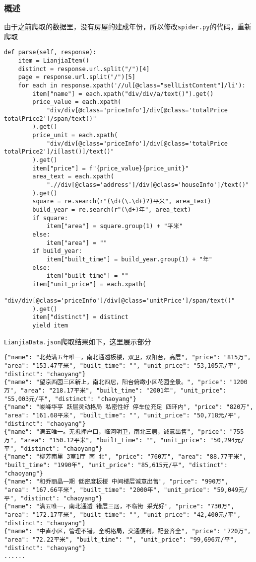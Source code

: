 \documentclass[lang=cn,11pt,a4paper]{elegantpaper}
\begin{document}
\subsubsection{概述}
由于之前爬取的数据里，没有房屋的建成年份，所以修改\lstinline{spider.py}的代码，重新爬取
\begin{lstlisting}
def parse(self, response):
    item = LianjiaItem()
    distinct = response.url.split("/")[4]
    page = response.url.split("/")[5]
    for each in response.xpath('//ul[@class="sellListContent"]/li'):
        item["name"] = each.xpath("div/div/a/text()").get()
        price_value = each.xpath(
            "div/div[@class='priceInfo']/div[@class='totalPrice totalPrice2']/span/text()"
        ).get()
        price_unit = each.xpath(
            "div/div[@class='priceInfo']/div[@class='totalPrice totalPrice2']/i[last()]/text()"
        ).get()
        item["price"] = f"{price_value}{price_unit}"
        area_text = each.xpath(
            ".//div[@class='address']/div[@class='houseInfo']/text()"
        ).get()
        square = re.search(r"(\d+(\.\d+)?)平米", area_text)
        build_year = re.search(r"(\d+)年", area_text)
        if square:
            item["area"] = square.group(1) + "平米"
        else:
            item["area"] = ""
        if build_year:
            item["built_time"] = build_year.group(1) + "年"
        else:
            item["built_time"] = ""
        item["unit_price"] = each.xpath(
            "div/div[@class='priceInfo']/div[@class='unitPrice']/span/text()"
        ).get()
        item["distinct"] = distinct
        yield item
\end{lstlisting}

\lstinline{LianjiaData.json}爬取结果如下，这里展示部分
\begin{lstlisting}[language=text]
{"name": "北苑满五年唯一，南北通透板楼，双卫，双阳台，高层", "price": "815万", "area": "153.47平米", "built_time": "", "unit_price": "53,105元/平", "distinct": "chaoyang"}
{"name": "望京西园三区新上，南北四居，阳台俯瞰小区花园全景。", "price": "1200万", "area": "218.17平米", "built_time": "2001年", "unit_price": "55,003元/平", "distinct": "chaoyang"}
{"name": "峻峰华亭 跃层灵动格局 私密性好 停车位充足 四环内", "price": "820万", "area": "161.68平米", "built_time": "", "unit_price": "50,718元/平", "distinct": "chaoyang"}
{"name": "满五唯一。无抵押户口，临河明卫，南北三居，诚意出售", "price": "755万", "area": "150.12平米", "built_time": "", "unit_price": "50,294元/平", "distinct": "chaoyang"}
{"name": "柳芳南里 3室1厅 南 北", "price": "760万", "area": "88.77平米", "built_time": "1990年", "unit_price": "85,615元/平", "distinct": "chaoyang"}
{"name": "和乔丽晶一期 低密度板楼 中间楼层诚意出售", "price": "990万", "area": "167.66平米", "built_time": "2000年", "unit_price": "59,049元/平", "distinct": "chaoyang"}
{"name": "满五唯一，南北通透 错层三居，不临街 采光好", "price": "730万", "area": "172.17平米", "built_time": "", "unit_price": "42,400元/平", "distinct": "chaoyang"}
{"name": "中直小区，管理不错，全明格局，交通便利，配套齐全", "price": "720万", "area": "72.22平米", "built_time": "", "unit_price": "99,696元/平", "distinct": "chaoyang"}
......
\end{lstlisting}
\end{document}
